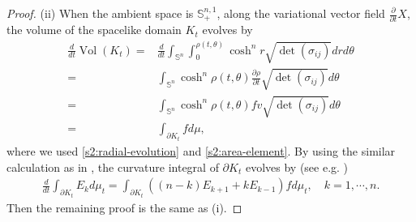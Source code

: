 \documentclass[11pt,reqno]{amsart}
\theoremstyle{definition}
\theoremstyle{remark}
\numberwithin{equation}{section}
\renewcommand{\(}{\left(}
\renewcommand{\)}{\right)}
\renewcommand{\~}{\tilde}
\renewcommand{\-}{\overline}
\renewcommand{\t}{\theta}
\newcommand{\s}{\sigma}
\newcommand{\Vol}{\operatorname{Vol}}
\begin{document}
\begin{proof}
	(ii) When the ambient space is $\mathbb S_{+}^{n,1}$, along the variational vector field $\frac{\partial}{\partial t}X$, the volume of the spacelike domain $K_t$ evolves by
	\begin{align*}
	\frac{d}{dt}\Vol(K_t)=&\frac{d}{dt}\int_{\mathbb S^n}\int_0^{\rho(t,\t)}	\cosh^n r \sqrt{\det(\s_{ij})}dr d\t\\
	=&\int_{\mathbb S^n}\cosh^n \rho(t,\t) \frac{\partial\rho}{\partial t} \sqrt{\det(\s_{ij})} d\t \\
	=&\int_{\mathbb S^n}\cosh^n \rho(t,\t) f v \sqrt{\det(\s_{ij})} d\t \\
	=&\int_{\partial K_t} f d\mu,
	\end{align*}
	where we used \eqref{s2:radial-evolution} and \eqref{s2:area-element}. By using the similar calculation as in \cite[Theorem A]{Reilly73}, the curvature integral of $\partial K_t$ evolves by (see e.g. \cite[Proposition 2]{Solanes-Teufel05})
	\begin{align}\label{s2:curvature-integral-de-Sitter}
	\frac{d}{dt}\int_{\partial K_t} E_k d\mu_t = \int_{\partial K_t} \( (n-k)E_{k+1}+kE_{k-1}   \)f d\mu_t, \quad k=1,\cdots,n.
	\end{align} 
	Then the remaining proof is the same as (i). 
\end{proof}
\end{document}
